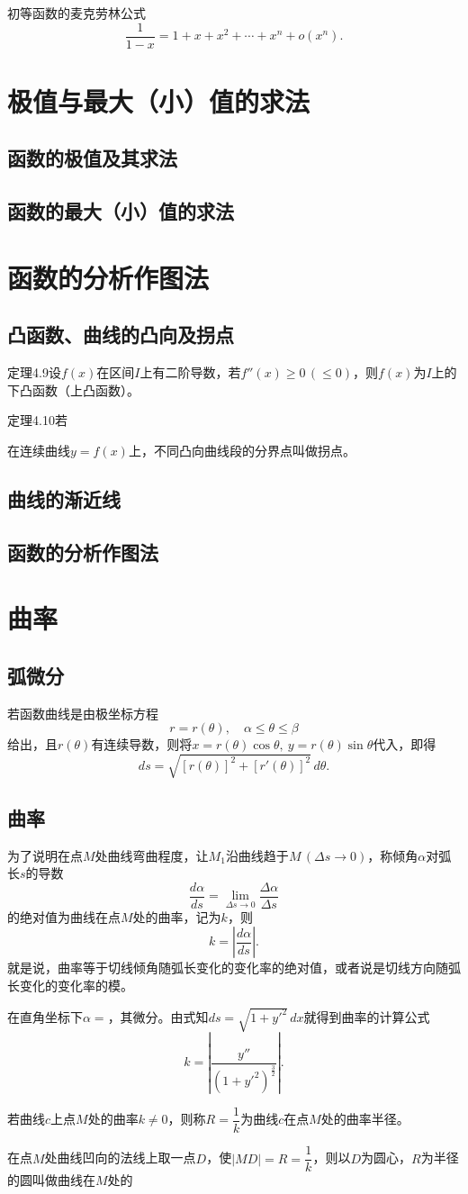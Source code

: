 \noindent 初等函数的麦克劳林公式
\[
\frac{1}{1-x}=1+x+x^2+\cdots+x^n+o(x^n).
\]

\section{极值与最大（小）值的求法}
\subsection{函数的极值及其求法}

\subsection{函数的最大（小）值的求法}

\section{函数的分析作图法}
\subsection{凸函数、曲线的凸向及拐点}
定理4.9\quad 设$f(x)$在区间$I$上有二阶导数，若$f''(x)\ge 0\,(\le 0)$，则$f(x)$为$I$上的下凸函数（上凸函数）。

定理4.10\quad 若

\noindent 在连续曲线$y=f(x)$上，不同凸向曲线段的分界点叫做拐点。

\subsection{曲线的渐近线}

\subsection{函数的分析作图法}

\section{曲率}
\subsection{弧微分}
若函数曲线是由极坐标方程
\[
r=r(\theta),\quad \alpha\le\theta\le\beta
\]
给出，且$r(\theta)$有连续导数，则将$x=r(\theta)\cos\theta,\ y=r(\theta)\sin\theta$代入，即得
\[
ds=\sqrt{[r(\theta)]^2+[r'(\theta)]^2}\,d\theta.
\]

\subsection{曲率}
为了说明在点$M$处曲线弯曲程度，让$M_1$沿曲线趋于$M\,(\Delta s\rightarrow 0)$，称倾角$\alpha$对弧长$s$的导数
\[
\frac{d\alpha}{ds}=\lim_{\Delta s\rightarrow0}\frac{\Delta\alpha}{\Delta s}
\]
的绝对值为曲线在点$M$处的曲率，记为$k$，则
\[
k=\left|\frac{d\alpha}{ds}\right|.
\]
就是说，曲率等于切线倾角随弧长变化的变化率的绝对值，或者说是切线方向随弧长变化的变化率的模。

在直角坐标下$\alpha=$，其微分。由式知$ds=\sqrt{1+y'^2}\,dx$就得到曲率的计算公式
\[
k=\left|\frac{y''}{\left(1+y'^2\right)^{\frac{3}{2}}}\right|.
\]

若曲线$c$上点$M$处的曲率$k\neq0$，则称$R=\dfrac{1}{k}$为曲线$c$在点$M$处的曲率半径。

在点$M$处曲线凹向的法线上取一点$D$，使$|MD|=R=\dfrac{1}{k}$，则以$D$为圆心，$R$为半径的圆叫做曲线在$M$处的